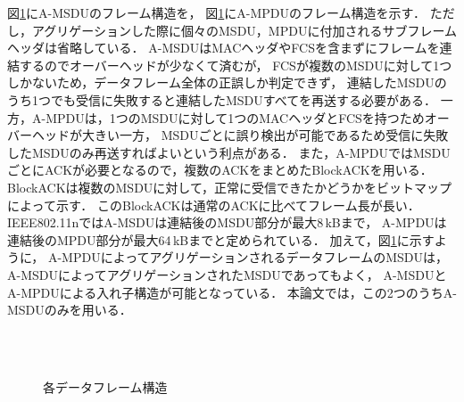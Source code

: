 \documentclass[master]{kuisthesis}		%
\begin{document}
			\par
			図\ref{fig:frame}にA-MSDUのフレーム構造を，
			図\ref{fig:frame}にA-MPDUのフレーム構造を示す．
			ただし，アグリゲーションした際に個々のMSDU，MPDUに付加されるサブフレームヘッダは省略している．
			A-MSDUはMACヘッダやFCSを含まずにフレームを連結するのでオーバーヘッドが少なくて済むが，
			FCSが複数のMSDUに対して1つしかないため，データフレーム全体の正誤しか判定できず，
			連結したMSDUのうち1つでも受信に失敗すると連結したMSDUすべてを再送する必要がある．
			一方，A-MPDUは，1つのMSDUに対して1つのMACヘッダとFCSを持つためオーバーヘッドが大きい一方，
			MSDUごとに誤り検出が可能であるため受信に失敗したMSDUのみ再送すればよいという利点がある．
			また，A-MPDUではMSDUごとにACKが必要となるので，複数のACKをまとめたBlockACKを用いる．
			BlockACKは複数のMSDUに対して，正常に受信できたかどうかをビットマップによって示す．
			このBlockACKは通常のACKに比べてフレーム長が長い．
			IEEE802.11nではA-MSDUは連結後のMSDU部分が最大8\,kBまで，
			A-MPDUは連結後のMPDU部分が最大64\,kBまでと定められている\cite{stdn}．
			加えて，図\ref{fig:frame}に示すように，
			A-MPDUによってアグリゲーションされるデータフレームのMSDUは，A-MSDUによってアグリゲーションされたMSDUであってもよく，
			A-MSDUとA-MPDUによる入れ子構造が可能となっている．
			本論文では，この2つのうちA-MSDUのみを用いる．

			\begin{figure}[t]
				\begin{center}
					\\
					\\
					\caption{各データフレーム構造}
					\label{fig:frame}
				\end{center}
			\end{figure}
\end{document}
